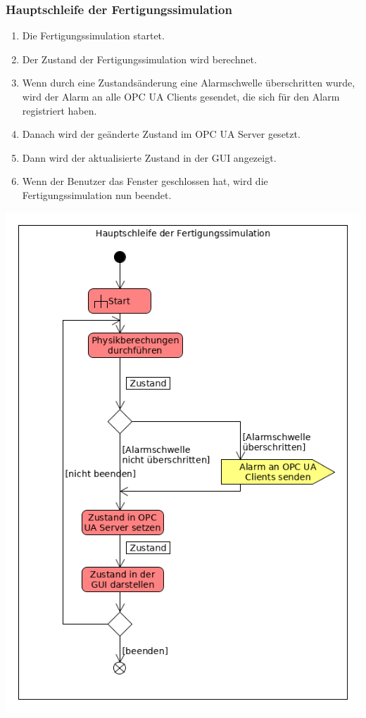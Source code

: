 \documentclass[parskip=full]{scrartcl}
\begin{document}
\subsubsection{Hauptschleife der \gls{Fertigungssimulation}}
\begin{enumerate}[noitemsep]
 \item Die Fertigungssimulation startet.
 \item Der Zustand der \gls{Fertigungssimulation} wird berechnet.
 \item Wenn durch eine Zustandsänderung eine Alarmschwelle überschritten wurde, wird der Alarm an alle OPC UA Clients gesendet,
 die sich für den Alarm registriert haben.
 \item Danach wird der geänderte Zustand im OPC UA Server gesetzt.
 \item Dann wird der aktualisierte Zustand in der GUI angezeigt.
 \item Wenn der Benutzer das Fenster geschlossen hat, wird die \gls{Fertigungssimulation} nun beendet.
\end{enumerate}
\begin{center}
  \includegraphics[scale=0.62]{media/Activities/main-simulation.png}
\end{center}
\end{document}
